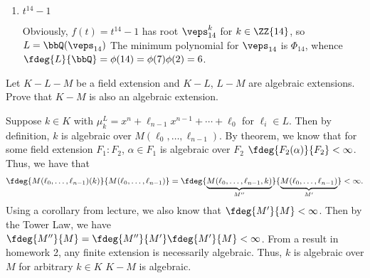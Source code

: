\documentclass{article}
\begin{document}
\begin{enumerate}
\begin{proof}[Solution.]
  $ (n=4) $ We have that $ f(t) = t^8 - 2^4 $.
  Then, $ t = (2^4)^{1/8}$ and $t = \sqrt{2}\cdot \veps_8^k$, where $ k\in\Zei $ and $ \veps_8=\exp(i\frac{2\pi}{8})=\exp(i\frac{\pi}{4}) $.
  We know the minimum polynomial of $ \veps_8 $ over $ \bbQ $ is the eighth cyclotomic polynomial $ \Phi_8 $, which has degree $ \phi(8) = 2^3-2^2 = 4 $.
  Thus $ \fdeg{\bbQ(\veps_8)}{\bbQ} = 4 $.
  Now, notice $ \veps_8 = \frac{\sqrt 2}{2}+i\frac{\sqrt 2}{2} $ and $ \veps_8\inv = \frac{\sqrt 2}{2}+i\frac{\sqrt 2}{2} $.
  So, $ \veps_8 + \veps_8\inv = \frac{\sqrt 2}{2} + \frac{\sqrt 2}{2} = \sqrt 2 \in \bbQ(\veps_8) $.
  Thus $ L = \bbQ(\veps_8) $ is the \sf for $ f $ over $ \bbQ $ and $ \fdeg{L}{\bbQ} = 4 $.
\end{proof}

\item $ t^{14}-1 $
\begin{solution}
  Obviously, $ f(t) = t^{14} - 1 $ has root $ \veps_{14}^k $ for $ k\in \ZZ{14} $, so $ L = \bbQ(\veps_{14}) $
  The minimum polynomial for $ \veps_{14} $ is $ \Phi_{14} $, whence $ \fdeg{L}{\bbQ} = \phi(14) = \phi(7)\phi(2)=6 $.
\end{solution}
\end{enumerate}

\begin{exercise}
  Let $ K-L-M $ be a field extension and $ K-L $, $ L-M $ are algebraic extensions.
  Prove that $ K-M $ is also an algebraic extension.
\end{exercise}

\begin{solution}
Suppose $ k\in K $ with $ \mu_k^L = x^n + \ell_{n-1}x^{n-1} + \cdots + \ell_0 $ for $ \ell_i\in L $.
Then by definition, $ k $ is algebraic over $ M(\ell_0,\ldots,\ell_{n-1}) $.
By theorem, we know that for some field extension $ F_1:F_2 $, $ \alpha\in F_1 $ is algebraic over $ F_2 $ \iff $ \fdeg{F_2(\alpha)}{F_2}<\infty $.
Thus, we have that \begin{align*}
  \fdeg{M(\ell_0,\ldots,\ell_{n-1})(k)}{M(\ell_0,\ldots,\ell_{n-1})} = \fdeg{\underbrace{M(\ell_0,\ldots,\ell_{n-1},k)}_{M''}}{\underbrace{M(\ell_0,\ldots,\ell_{n-1})}_{M'}} < \infty.
\end{align*}
Using a corollary from lecture, we also know that $ \fdeg{M'}{M} < \infty $.
Then by the Tower Law, we have $ \fdeg{M''}{M} = \fdeg{M''}{M'}\fdeg{M'}{M} < \infty $.
From a result in homework 2, any finite extension is necessarily algebraic.
Thus, $ k $ is algebraic over $ M $ for arbitrary $ k \in K $ \imp $ K-M $ is algebraic.
\end{solution}
\end{document}
